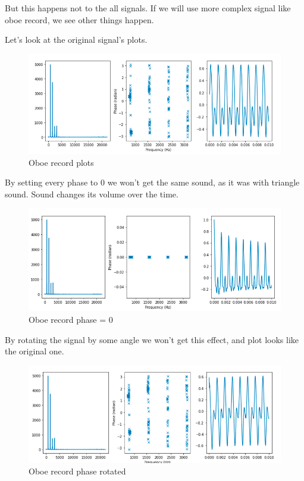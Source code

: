 \documentclass[a4paper]{article}
\begin{document}
        But this happens not to the all signals. If we will use more complex signal like oboe record, we see other things happen.
        
        Let's look at the original signal's plots.
        
        \begin{figure}[H]
            \centering
            \includegraphics[width=\textwidth]{img/ph6.png}
            \caption{Oboe record plots}
            \label{fig:als_clr}
        \end{figure}
        
        By setting every phase to 0 we won't get the same sound, as it was with triangle sound. Sound changes its volume over the time.
        
        \begin{figure}[H]
            \centering
            \includegraphics[width=\textwidth]{img/ph7.png}
            \caption{Oboe record phase = 0}
            \label{fig:als_clr}
        \end{figure}
        
        By rotating the signal by some angle we won't get this effect, and plot looks like the original one.
        
        \begin{figure}[H]
            \centering
            \includegraphics[width=\textwidth]{img/ph8.png}
            \caption{Oboe record phase rotated}
            \label{fig:als_clr}
        \end{figure}
        
\end{document}
